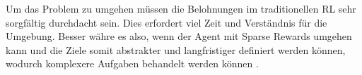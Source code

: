 Um das Problem zu umgehen müssen die Belohnungen im traditionellen RL sehr sorgfältig durchdacht sein. Dies erfordert viel Zeit und Verständnis für die Umgebung. Besser währe es also, wenn der Agent mit Sparse Rewards umgehen kann und die Ziele somit abstrakter und langfristiger definiert werden können, wodurch komplexere Aufgaben behandelt werden können \cite{hare2019dealing}.

